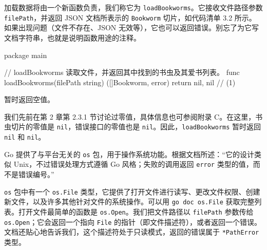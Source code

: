 加载数据将由一个新函数负责，我们称它为 \texttt{loadBookworms}。它接收文件路径参数 \texttt{filePath}，并返回 JSON 文档所表示的 \texttt{Bookworm} 切片，如代码清单 3.2 所示。如果出现问题（文件不存在、JSON 无效等），它也可以返回错误。别忘了为它写文档字符串，也就是说明函数用途的注释。

\begin{gocode}[title={代码清单 3.2 \texttt{bookworm.go}：\texttt{loadBookworms} 的签名}]
package main

// loadBookworms 读取文件，并返回其中找到的书虫及其爱书列表。
func loadBookworms(filePath string) ([]Bookworm, error) {
    return nil, nil // (1)
}
\end{gocode}

\begin{codeannotations}
  \item 暂时返回空值。
\end{codeannotations}

我们先前在第 2 章第 2.3.1 节讨论过零值，具体信息也可参阅附录 C。在这里，书虫切片的零值是
\texttt{nil}，错误接口的零值也是 \texttt{nil}。因此，\texttt{loadBookworms} 暂时返回 \texttt{nil} 和 \texttt{nil}。

Go 提供了与平台无关的 \texttt{os} 包，用于操作系统功能。根据文档所述：“它的设计类似 Unix，不过错误处理方式遵循 Go 风格；失败的调用返回 \texttt{error} 类型的值，而不是错误编号。”

\texttt{os} 包中有一个 \texttt{os.File} 类型，它提供了打开文件进行读写、更改文件权限、创建新文件，以及许多其他针对文件的系统操作。可以用 \texttt{go doc os.File} 获取完整列表。打开文件最简单的函数是 \texttt{os.Open}。我们把文件路径以 \texttt{filePath} 参数传给 \texttt{os.Open}；它会返回一个指向 \texttt{File} 的指针（即文件描述符），或者返回一个错误。文档还贴心地告诉我们，这个描述符处于只读模式，返回的错误属于 \texttt{*PathError} 类型。

